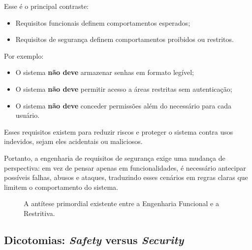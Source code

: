 \documentclass[12pt,a4paper,twoside]{report}
\begin{document}
Esse é o principal contraste:  
\begin{itemize}
    \item Requisitos funcionais definem comportamentos esperados;
    \item Requisitos de segurança definem comportamentos proibidos ou restritos.
\end{itemize}

Por exemplo:
\begin{itemize}
    \item O sistema \textbf{não deve} armazenar senhas em formato legível;
    \item O sistema \textbf{não deve} permitir acesso a áreas restritas sem autenticação;
    \item O sistema \textbf{não deve} conceder permissões além do necessário para cada usuário.
\end{itemize}

Esses requisitos existem para reduzir riscos e proteger o sistema contra usos indevidos, sejam eles acidentais ou maliciosos.

Portanto, a engenharia de requisitos de segurança exige uma mudança de perspectiva: em vez de pensar apenas em funcionalidades, é necessário antecipar possíveis falhas, abusos e ataques, traduzindo esses cenários em regras claras que limitem o comportamento do sistema.
\begin{figure}[h]
    \centering
    \caption{A antítese primordial existente entre a Engenharia Funcional e a Restritiva.}
    \label{fig:func_vs_sec}
\end{figure}

\subsection{Dicotomias: \textit{Safety} versus \textit{Security}}
\end{document}
